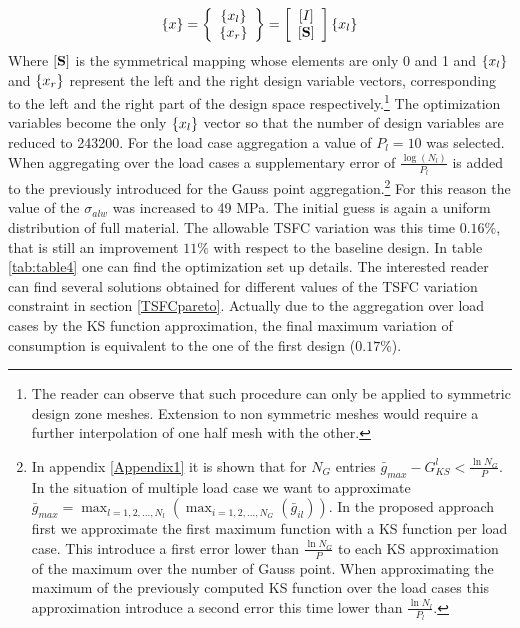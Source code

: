  \begin{equation}
 \left\lbrace{x}\right \rbrace=\left\lbrace{\begin{array}{c}
 \ensuremath\left\lbrace{x_l}\right \rbrace\\
  \ensuremath\left\lbrace{x_r}\right \rbrace
 \end{array}}\right \rbrace=\left[{\begin{array}{c}
  \left[{I}\right]\\
   \left[{\mathbf{S}}\right]
   \end{array}}\right]\left\lbrace{x_l}\right \rbrace
 \end{equation}
 Where $\left[{\mathbf{S}}\right]$ is the symmetrical mapping whose elements are only 0 and 1 and $\left\lbrace{x_l}\right \rbrace$ and $\left\lbrace{x_r}\right \rbrace$ represent the left and the right design variable vectors, corresponding to the left and the right part of the design space respectively.\footnote{The reader can observe that such procedure can only be applied to symmetric design zone meshes. Extension to non symmetric meshes would require a further interpolation of one half mesh with the other.}  The optimization variables become the only $\left\lbrace{x_l}\right \rbrace$ vector so that the number of design variables are reduced to 243200. For the load case aggregation a value of $P_l=10$ was selected.  When aggregating over the load cases a supplementary error of $\frac{\log(N_l)}{P_l}$ is added to the previously introduced for the Gauss point aggregation.\footnote{In appendix \ref{Appendix1} it is shown that for $N_G$ entries $\bar{g}_{max}-G_{KS}^l<\frac{\ln{N_G}}{P}$. In the situation of multiple load case we want to approximate $\bar{g}_{max}=\max_{l=1,2,...,N_l}(\max_{i=1,2,...,N_G}(\bar{g}_{il}))$. In the proposed approach first we approximate the first maximum function with a KS function per load case. This introduce a first error lower than $\frac{\ln{N_G}}{P}$ to each KS approximation of the maximum over the number of Gauss point. When approximating the maximum of the previously computed KS function over the load cases this approximation introduce a second error this time lower than $\frac{\ln{N_l}}{P_l}$.}  For this reason the value of the $\sigma_{alw}$ was increased to 49 MPa. The initial guess is again a uniform distribution of full material. The allowable TSFC variation was this time $0.16 \%$, that is still an improvement  $11 \%$ with respect to the baseline design.  In table \ref{tab:table4} one can find the optimization set up details. The interested reader can find several solutions obtained for different values of the TSFC variation constraint in section \ref{TSFCpareto}. Actually due to the aggregation over load cases by the KS function approximation, the final maximum variation of consumption is equivalent to the one of the first design ($0.17 \%$).
  
